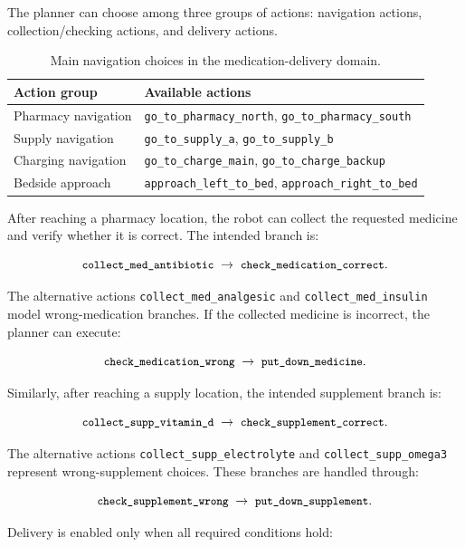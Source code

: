 \documentclass{article}
\newcommand{\pddl}[1]{\texttt{\small #1}}
\begin{document}
The planner can choose among three groups of actions: navigation actions,
collection/checking actions, and delivery actions.

\begin{table}[h]
\centering
\small
\begin{tabularx}{\linewidth}{lX}
\hline
\textbf{Action group} & \textbf{Available actions} \\
\hline
Pharmacy navigation &
\pddl{go\_to\_pharmacy\_north}, \pddl{go\_to\_pharmacy\_south} \\

Supply navigation &
\pddl{go\_to\_supply\_a}, \pddl{go\_to\_supply\_b} \\

Charging navigation &
\pddl{go\_to\_charge\_main}, \pddl{go\_to\_charge\_backup} \\

Bedside approach &
\pddl{approach\_left\_to\_bed}, \pddl{approach\_right\_to\_bed} \\
\hline
\end{tabularx}
\caption{Main navigation choices in the medication-delivery domain.}
\end{table}

After reaching a pharmacy location, the robot can collect the requested
medicine and verify whether it is correct. The intended branch is:

\[
\pddl{collect\_med\_antibiotic}
\;\rightarrow\;
\pddl{check\_medication\_correct}.
\]

The alternative actions \pddl{collect\_med\_analgesic} and
\pddl{collect\_med\_insulin} model wrong-medication branches. If the collected
medicine is incorrect, the planner can execute:

\[
\pddl{check\_medication\_wrong}
\;\rightarrow\;
\pddl{put\_down\_medicine}.
\]

Similarly, after reaching a supply location, the intended supplement branch is:

\[
\pddl{collect\_supp\_vitamin\_d}
\;\rightarrow\;
\pddl{check\_supplement\_correct}.
\]

The alternative actions \pddl{collect\_supp\_electrolyte} and
\pddl{collect\_supp\_omega3} represent wrong-supplement choices. These branches
are handled through:

\[
\pddl{check\_supplement\_wrong}
\;\rightarrow\;
\pddl{put\_down\_supplement}.
\]

Delivery is enabled only when all required conditions hold:
\end{document}
